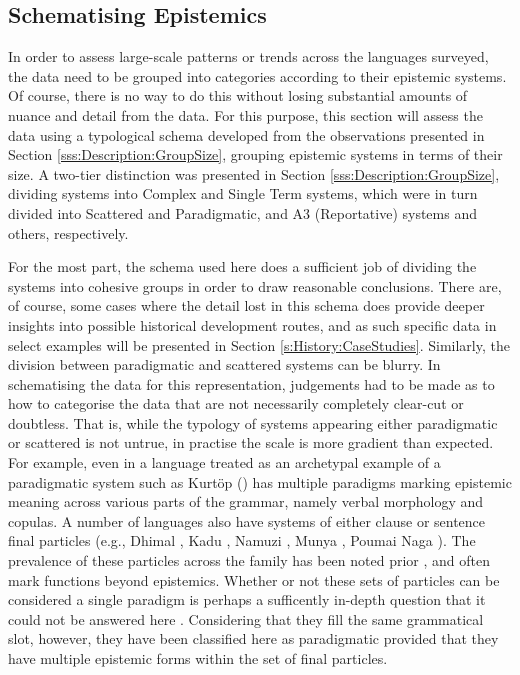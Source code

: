\subsection{Schematising Epistemics}\label{ss:History:Schema}
In order to assess large-scale patterns or trends across the languages surveyed, the data need to be grouped into categories according to their epistemic systems. Of course, there is no way to do this without losing substantial amounts of nuance and detail from the data. For this purpose, this section will assess the data using a typological schema developed from the observations presented in Section \ref{sss:Description:GroupSize}, grouping epistemic systems in terms of their size. A two-tier distinction was presented in Section \ref{sss:Description:GroupSize}, dividing systems into Complex and Single Term systems, which were in turn divided into Scattered and Paradigmatic, and A3 (Reportative) systems and others, respectively.

For the most part, the schema used here does a sufficient job of dividing the systems into cohesive groups in order to draw reasonable conclusions. There are, of course, some cases where the detail lost in this schema does provide deeper insights into possible historical development routes, and as such specific data in select examples will be presented in Section \ref{s:History:CaseStudies}. Similarly, the division between paradigmatic and scattered systems can be blurry. In schematising the data for this representation, judgements had to be made as to how to categorise the data that are not necessarily completely clear-cut or doubtless. That is, while the typology of systems appearing either paradigmatic or scattered is not untrue, in practise the scale is more gradient than expected. For example, even in a language treated as an archetypal example of a paradigmatic system such as Kurtöp (\cite[East Bodish: Bhutan, ][]{Hyslop2020Kurtop}) has multiple paradigms marking epistemic meaning across various parts of the grammar, namely verbal morphology and copulas. A number of languages also have systems of either clause or sentence final particles (e.g., Dhimal \cite{King2009}, Kadu \cite{Sangdong2012}, Namuzi \cite{Pavlik2017}, Munya \cite{Bai2019}, Poumai Naga \cite{Veikho2021}). The prevalence of these particles across the family has been noted prior \cite{DeLancey2011}, and often mark functions beyond epistemics. Whether or not these sets of particles can be considered a single paradigm is perhaps a sufficently in-depth question that it could not be answered here . Considering that they fill the same grammatical slot, however, they have been classified here as paradigmatic provided that they have multiple epistemic forms within the set of final particles.

